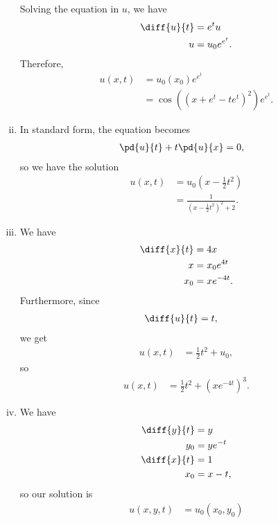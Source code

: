 \documentclass[10pt]{mypackage}
\begin{document}
\begin{solution}
\begin{enumerate}[(i)]
      Solving the equation in $u$, we have
      \begin{align*}
        \diff{u}{t} &= e^{t} u\\
        u &= u_0e^{e^{t}}.
      \end{align*}
      Therefore,
      \begin{align*}
        u\left( x,t \right) &= u_0\left( x_0 \right)e^{e^{t}}\\
                            &= \cos\left( \left( x + e^{t} - te^{t} \right)^2 \right)e^{e^{t}}.
      \end{align*}
    \item In standard form, the equation becomes
      \begin{align*}
        \pd{u}{t} + t\pd{u}{x} &= 0,
      \end{align*}
      so we have the solution
      \begin{align*}
        u\left( x,t \right) &= u_0\left( x-\frac{1}{2}t^2 \right)\\
                            &= \frac{1}{\left( x-\frac{1}{2}t^2 \right)^2 + 2}.
      \end{align*}
    \item We have
      \begin{align*}
        \diff{x}{t} &= 4x\\
        x &= x_0e^{4t}\\
        x_0 &= xe^{-4t}.
      \end{align*}
      Furthermore, since
      \begin{align*}
        \diff{u}{t} &= t,
      \end{align*}
      we get
      \begin{align*}
        u\left( x,t \right) &= \frac{1}{2}t^2 + u_0,
      \end{align*}
      so
      \begin{align*}
        u\left( x,t \right) &= \frac{1}{2}t^2 + \left( xe^{-4t} \right)^3.
      \end{align*}
    \item We have
      \begin{align*}
        \diff{y}{t} &= y\\
        y_0 &= ye^{-t}\\
        \diff{x}{t} &= 1\\
        x_0 &= x-t,
      \end{align*}
      so our solution is
      \begin{align*}
        u\left( x,y,t \right) &= u_0\left( x_0,y_0 \right)\\

\end{align*}
\end{enumerate}
\end{solution}
\end{document}
